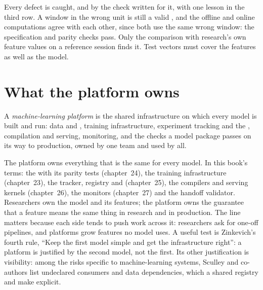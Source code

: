 Every defect is caught, and by the check written for it, with one lesson in the third row. A window in the wrong unit is still a
valid , and the offline and online computations agree with each other, since both use the same wrong window:
the specification and parity checks pass. Only the comparison with research's own feature values on a reference session finds
it. Test vectors must cover the features as well as the model.

\section{What the platform owns}

\begin{definition}\label{def:ml:the-machine-learning-team:platform}
A \emph{machine-learning platform} is the shared infrastructure on which every model is built
and run: data and , training infrastructure, experiment tracking and the , compilation and serving,
monitoring, and the checks a model package passes on its way to production, owned by one team and used by all.
\end{definition}

The platform owns everything that is the same for every model. In this book's terms: the  with its parity tests
(chapter~24), the training infrastructure (chapter~23), the tracker, registry and  (chapter~25), the compilers and
serving kernels (chapter~26), the monitors (chapter~27) and the handoff validator. Researchers own the model and its features;
the platform owns the guarantee that a feature means the same thing in research and in production. The line matters because each
side tends to push work across it: researchers ask for one-off pipelines, and platforms grow features no model uses. A useful
test is Zinkevich's fourth rule, ``Keep the first model simple and get the infrastructure right'': a platform is justified by the
second model, not the first. Its other justification is visibility: among the risks specific to machine-learning systems,
Sculley and co-authors list undeclared consumers and data dependencies, which a shared registry and  make explicit.

